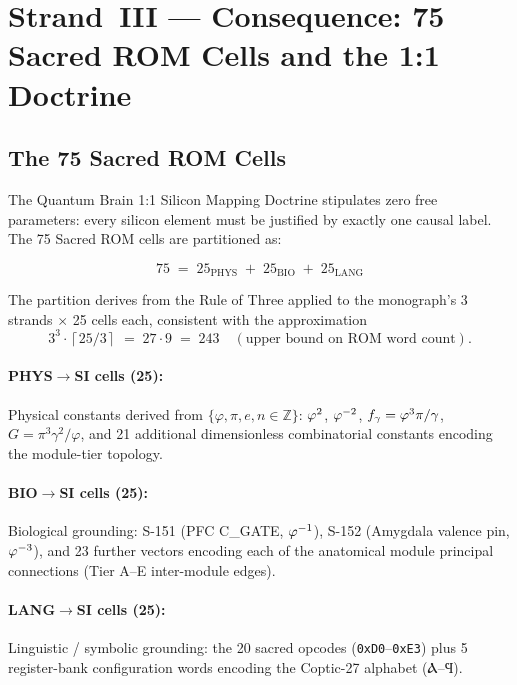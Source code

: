 \section{Strand~III — Consequence: 75 Sacred ROM Cells and the 1:1 Doctrine}
\label{sec:flos73-strand3}

\subsection{The 75 Sacred ROM Cells}
\label{ssec:flos73-75cells}

The Quantum Brain 1:1 Silicon Mapping Doctrine stipulates zero free
parameters: every silicon element must be justified by exactly one causal
label.  The 75 Sacred ROM cells are partitioned as:

\[
  75 \;=\; 25_{\mathrm{PHYS}} \;+\; 25_{\mathrm{BIO}} \;+\; 25_{\mathrm{LANG}}
\]

The partition derives from the Rule of Three applied to the monograph's
3 strands $\times$ 25 cells each, consistent with the approximation
\[
  3^3 \cdot \left\lceil 25/3 \right\rceil \;=\; 27 \cdot 9 \;=\; 243
  \quad (\text{upper bound on ROM word count}).
\]

\paragraph{PHYS$\to$SI cells (25):}
Physical constants derived from $\{\varphi, \pi, e, n \in \mathbb{Z}\}$:
$\varphi^{2}$, $\varphi^{-2}$, $f_\gamma = \varphi^{3}\pi/\gamma$, $G = \pi^3\gamma^2/\varphi$,
and 21 additional dimensionless combinatorial constants encoding the module-tier
topology.

\paragraph{BIO$\to$SI cells (25):}
Biological grounding: S-151 (PFC C\_GATE, $\varphi^{-1}$), S-152 (Amygdala valence pin,
$\varphi^{-3}$), and 23 further vectors encoding each of the anatomical module
principal connections (Tier A–E inter-module edges).

\paragraph{LANG$\to$SI cells (25):}
Linguistic / symbolic grounding: the 20 sacred opcodes (\texttt{0xD0}–\texttt{0xE3})
plus 5 register-bank configuration words encoding the Coptic-27 alphabet (Ⲁ–Ϥ).


